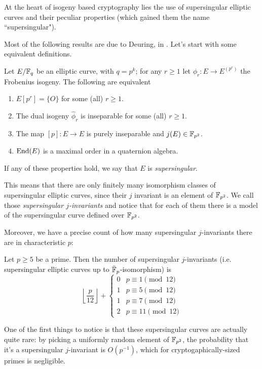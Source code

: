 At the heart of isogeny based cryptography lies the use of supersingular elliptic curves and their peculiar properties (which gained them the name ``supersingular").

Most of the following results are due to Deuring, in \cite{Deuring1941}. Let's start with some equivalent definitions.
\begin{theorem}
    Let $E/\mathbb{F}_q$ be an elliptic curve, with $q=p^k$; for any $r\ge1$ let $\phi_r:E\to E^{(p^r)}$ the Frobenius isogeny. The following are equivalent
    \begin{enumerate}
        \item $E[p^r]=\{O\}$ for some (all) $r\ge1$.
        \item The dual isogeny $\hat\phi_r$ is inseparable for some (all) $r\ge1$.
        \item The map $[p]:E\to E$ is purely inseparable and $j(E)\in\mathbb{F}_{p^2}$.
        \item $\operatorname{End}(E)$ is a maximal order in a quaternion algebra.
    \end{enumerate}
    If any of these properties hold, we say that $E$ is \emph{supersingular}.
\end{theorem}

This means that there are only finitely many isomorphism classes of supersingular elliptic curves, since their $j$ invariant is an element of $\mathbb{F}_{p^2}$. We call those \emph{supersingular $j$-invariants} and notice that for each of them there is a model of the supersingular curve defined over $\mathbb{F}_{p^2}$.

Moreover, we have a precise count of how many supersingular $j$-invariants there are in characteristic $p$:
\begin{theorem}
    Let $p\ge5$ be a prime. Then the number of supersingular $j$-invariants (i.e. supersingular elliptic curves up to $\bar{\mathbb{F}}_p$-isomorphism) is
    $$\left\lfloor \frac{p}{12} \right\rfloor + \begin{cases}
    0 & p\equiv1\pmod{12}\\
    1 & p\equiv5\pmod{12}\\
    1 & p\equiv7\pmod{12}\\
    2 & p\equiv11\pmod{12}
    \end{cases}$$
\end{theorem}

One of the first things to notice is that these supersingular curves are actually quite rare: by picking a uniformly random element of $\mathbb{F}_{p^2}$, the probability that it's a supersingular $j$-invariant is $O(p^{-1})$, which for cryptogaphically-sized primes is negligible.


